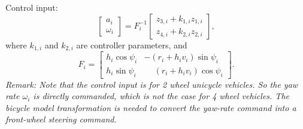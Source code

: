 \documentclass[11pt,a4paper]{article}
\begin{document}
Control input:
\begin{equation}
\begin{bmatrix}a_i\\\omega_i\end{bmatrix}
=F_i^{-1}
\begin{bmatrix}
z_{3,i}+k_{1,i}z_{1,i}\\
z_{4,i}+k_{2,i}z_{2,i}
\end{bmatrix},
\label{eq:chapter-three-feedback}
\end{equation}
where $k_{1,i}$ and $k_{2,i}$ are controller parameters, and
\begin{equation}
F_i=
\begin{bmatrix}
h_i\cos\psi_i & -(r_i+h_iv_i)\sin\psi_i\\
h_i\sin\psi_i & \phantom{-}(r_i+h_iv_i)\cos\psi_i
\end{bmatrix}.
\label{eq:unicycle-feedback-matrix}
\end{equation}
{\it Remark: Note that the control input is for 2 wheel unicycle vehicles. So the yaw rate $\omega_i$ is directly commanded, which is not the case for 4 wheel vehicles. The bicycle model transformation is needed to convert the yaw-rate command into a front-wheel steering command.}
\end{document}
